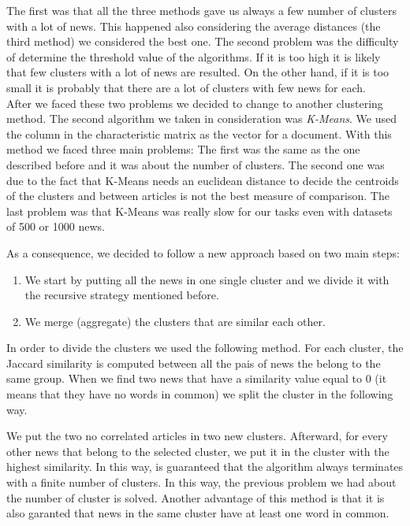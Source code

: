 \documentclass{acm_proc_article-sp}
\begin{document}
The first was that all the three methods gave us always a few number of clusters with a lot of news. This happened also considering the average distances (the third method) we considered the best one. The second problem was the difficulty of determine the threshold value of the algorithms. If it is too high it is likely that few clusters with a lot of news are resulted. On the other hand, if it is too small it is probably that there are a lot of clusters with few news for each.\\

After we faced these two problems we decided to change to another clustering method. The second algorithm we taken in consideration was \textit{K-Means}. We used the column in the characteristic matrix as the vector for a document. With this method we faced three main problems: The first was the same as the one described before and it was about the number of clusters. The second one was due to the fact that K-Means needs an euclidean distance to decide the centroids of the clusters and between articles is not the best measure of comparison. The last problem was that K-Means was really slow for our tasks even with datasets of 500 or 1000 news.

As a consequence, we decided to follow a new approach based on two main steps:
\begin{enumerate}
\item We start by putting all the news in one single cluster and we divide it with the recursive strategy mentioned before.
\item We merge (aggregate) the clusters that are similar each other.
\end{enumerate}
In order to divide the clusters we used the following method. For each cluster, the Jaccard similarity is computed between all the pais of news the belong to the same group. When we find two news that have a similarity value equal to 0 (it means that they have no words in common) we split the cluster in the following way.

We put the two no correlated articles in two new clusters. Afterward, for every other news that belong to the selected cluster, we put it in the cluster with the highest similarity. In this way, is guaranteed that the algorithm always terminates with a finite number of clusters. In this way, the previous problem we had about the number of cluster is solved. Another advantage of this method is that it is also garanted that news in the same cluster have at least one word in common.
\end{document}
